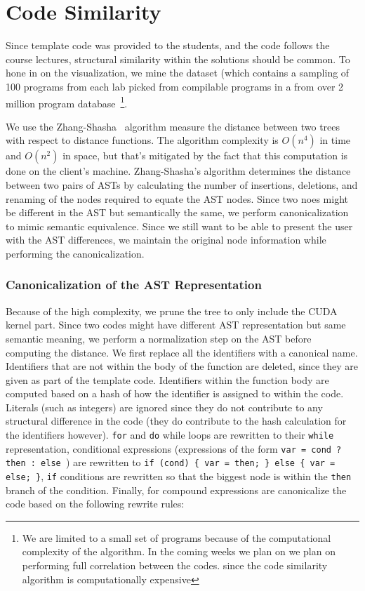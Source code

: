\documentclass[nocopyrightspace]{sigchi}
\begin{document}
\section{Code Similarity}

Since template code was provided to the students, and the code follows the course
lectures, structural similarity within the solutions should be common. To hone in
on the visualization, we mine the dataset (which contains a sampling of 100 programs
from each lab picked from compilable programs in a  from over 2 million program
database~\footnote{We are limited to a small set of programs because
of the computational complexity of the algorithm. In the coming weeks we plan on
we plan on performing full correlation between the codes. since
the code similarity algorithm is computationally expensive}.

We use the Zhang-Shasha~\cite{zhang1989simple} algorithm measure the distance between two trees with respect to
distance functions. The algorithm complexity is $O(n^4)$ in time and $O(n^2)$ in space, but
that's mitigated by the fact that this computation is done on the client's machine.
Zhang-Shasha's algorithm determines the distance between two pairs of ASTs by
calculating the number of insertions, deletions, and renaming of the nodes
required to equate the AST nodes. Since two noes might be different in the AST but semantically
the same, we perform canonicalization to mimic semantic equivalence. Since we still want
to be able to present the user with the AST differences, we maintain the original node
information while performing the canonicalization.

\subsubsection{Canonicalization of the AST Representation}

Because of the high complexity, we prune the tree to only include the CUDA kernel part.
Since two codes might have different AST representation but same semantic meaning,
we perform a normalization step on the AST before computing the distance.
We first replace all the identifiers with a canonical name. Identifiers that are not within
the body of the function are deleted, since they are given as part of the template code.
Identifiers within the function body are computed based on
a hash of how the identifier is assigned to within the code.
Literals (such as integers) are ignored since they do not contribute to any structural
difference in the code (they do contribute to the hash calculation for the identifiers however).
{\tt for} and {\tt do} while loops are rewritten to their {\tt while} representation,
conditional expressions (expressions of the form {\tt var = cond ? then : else }) are rewritten
to {\tt if (cond) \{ var = then; \} else \{ var = else; \}},
{\tt if} conditions are rewritten so that the biggest node is within the {\tt then} branch
of the condition. Finally, for compound expressions are canonicalize the code based on the
following rewrite rules:
\end{document}
